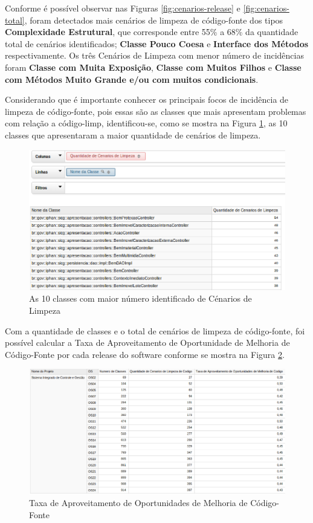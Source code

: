 Conforme é possível observar nas Figuras \ref{fig:cenarios-release} e \ref{fig:cenarios-total}, foram detectados mais cenários de limpeza de código-fonte dos tipos \textbf{Complexidade Estrutural}, que corresponde entre 55\% a 68\% da quantidade total de cenários identificados; \textbf{Classe Pouco Coesa} e \textbf{Interface dos Métodos} respectivamente. Os três Cenários de Limpeza com menor número de incidências foram \textbf{Classe com Muita Exposição}, \textbf{Classe com Muitos Filhos} e \textbf{Classe com Métodos Muito Grande e/ou com muitos condicionais}.


Considerando que é importante conhecer os principais focos de incidência de limpeza de código-fonte, pois essas são as classes que mais apresentam problemas com relação a código-limp, identificou-se, como se mostra na Figura \ref{fig:worst-10-cenarios}, as 10 classes que apresentaram a maior quantidade de cenários de limpeza.

\begin{figure}[ht!]
\centering
\includegraphics[keepaspectratio=true,scale=0.55]{figuras/10-best.eps}
\caption{As 10 classes com maior número identificado de Cénarios de Limpeza}
\label{fig:worst-10-cenarios}
\end{figure}
\FloatBarrier

Com a quantidade de classes e o total de cenários de limpeza de código-fonte, foi possível calcular a Taxa de Aproveitamento de Oportunidade de Melhoria de Código-Fonte por cada release do software conforme se mostra na Figura \ref{fig:taxa-cenarios}.

\begin{figure}[H]
\centering
\includegraphics[keepaspectratio=true,scale=0.38]{figuras/taxa-parcial.eps}
\caption{Taxa de Aproveitamento de Oportunidades de Melhoria de Código-Fonte}
\label{fig:taxa-cenarios}
\end{figure}
\FloatBarrier

